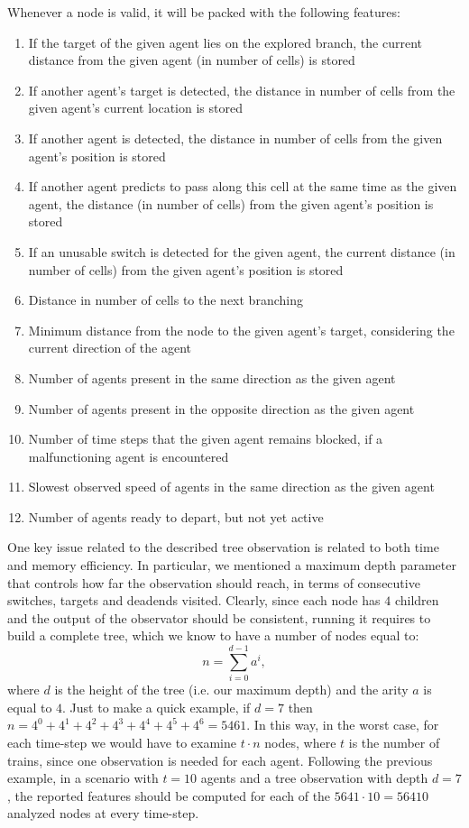 \documentclass[a4paper,10pt]{report}
\begin{document}
Whenever a node is valid, it will be packed with the following features:
\begin{enumerate}
	\item If the target of the given agent lies on the explored branch, the current distance from the given agent (in number of cells) is stored
	\item If another agent's target is detected, the distance in number of cells from the given agent's current location is stored
	\item If another agent is detected, the distance in number of cells from the given agent's position is stored
	\item If another agent predicts to pass along this cell at the same time as the given agent, the distance (in number of cells) from the given agent's position is stored
	\item If an unusable switch is detected for the given agent, the current distance (in number of cells) from the given agent's position is stored
	\item Distance in number of cells to the next branching
	\item Minimum distance from the node to the given agent's target, considering the current direction of the agent
	\item Number of agents present in the same direction as the given agent
	\item Number of agents present in the opposite direction as the given agent
	\item Number of time steps that the given agent remains blocked, if a malfunctioning agent is encountered
	\item Slowest observed speed of agents in the same direction as the given agent
	\item Number of agents ready to depart, but not yet active
\end{enumerate}

One key issue related to the described tree observation is related to both time and memory efficiency. In particular, we mentioned a maximum depth parameter that controls how far the observation should reach, in terms of consecutive switches, targets and deadends visited. Clearly, since each node has $4$ children and the output of the observator should be consistent, running it requires to build a complete tree, which we know to have a number of nodes equal to:
$$
n = \sum_{i=0}^{d-1}a^i,
$$
where $d$ is the height of the tree (i.e. our maximum depth) and the arity $a$ is equal to $4$. Just to make a quick example, if $d=7$ then $n=4^0+4^1+4^2+4^3+4^4+4^5+4^6=\num{5461}$. In this way, in the worst case, for each time-step we would have to examine $t\cdot n$ nodes, where $t$ is the number of trains, since one observation is needed for each agent. Following the previous example, in a scenario with $t=10$ agents and a tree observation with depth $d=7$, the reported features should be computed for each of the $\num{5641}\cdot 10=\num{56410}$ analyzed nodes at every time-step. 
\end{document}
